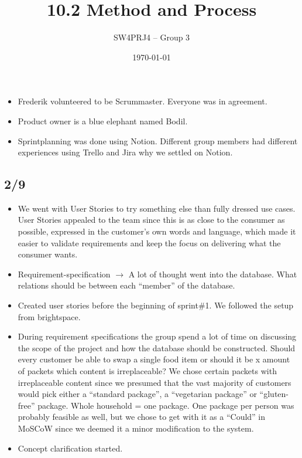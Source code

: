 \documentclass[a4paper,11pt]{article}
\title{10.2 Method and Process}
\author{SW4PRJ4 -- Group 3}
\date{\today}
\begin{document}
\maketitle

\begin{itemize}
    \item Frederik volunteered to be Scrummaster. Everyone was in agreement.
    \item Product owner is a blue elephant named Bodil.
    \item Sprintplanning was done using Notion. Different group members had different experiences using Trello and Jira why we settled on Notion.
\end{itemize}

\subsection*{2/9}
\begin{itemize}
    \item We went with User Stories to try something else than fully dressed use cases. User Stories appealed to the team since this is as close to the consumer as possible, expressed in the customer's own words and language, which made it easier to validate requirements and keep the focus on delivering what the consumer wants.
    \item Requirement-specification $\rightarrow$ A lot of thought went into the database. What relations should be between each ``member'' of the database.
    \item Created user stories before the beginning of sprint\#1. We followed the setup from brightspace.
    \item During requirement specifications the group spend a lot of time on discussing the scope of the project and how the database should be constructed. Should every customer be able to swap a single food item or should it be x amount of packets which content is irreplaceable? We chose certain packets with irreplaceable content since we presumed that the vast majority of customers would pick either a ``standard package'', a ``vegetarian package'' or ``gluten-free'' package. Whole household = one package. One package per person was probably feasible as well, but we chose to get with it as a ``Could'' in MoSCoW since we deemed it a minor modification to the system.
    \item Concept clarification started.
\end{itemize}
\end{document}
